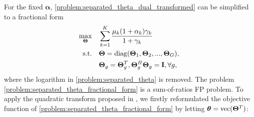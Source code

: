 For the fixed $\boldsymbol{\alpha}$, \eqref{problem:separated_theta_dual_transformed} can be simplified to a fractional form
\begin{subequations} \label{problem:separated_theta_fractional_form}
    \begin{align}
        \max_{\mathbf{\Theta}} \quad & \sum_{k=1}^K \frac{\mu_k(1+\alpha_k)\gamma_k}{1+\gamma_k}\\
        \mathrm{s.t.} \quad & {\bf \Theta} = \mathrm{diag}({\bf \Theta}_1,{\bf \Theta}_2,...,{\bf \Theta}_G) ,
        \\ &{\bf \Theta}_g = {\bf \Theta}_g^T, {\bf \Theta}_g^H{\bf \Theta}_g = {\bf I}, \forall g,
    \end{align}
\end{subequations}
where the logarithm in \eqref{problem:separated_theta} is removed. The problem \eqref{problem:separated_theta_fractional_form} 
is a sum-of-ratios FP problem. To apply the quadratic transform
proposed in \cite{shen2018fractional}, we firstly reformulated the objective function
of \eqref{problem:separated_theta_fractional_form} by letting $\boldsymbol{\theta} = \mathrm{vec}({\bf \Theta}^T)$:

